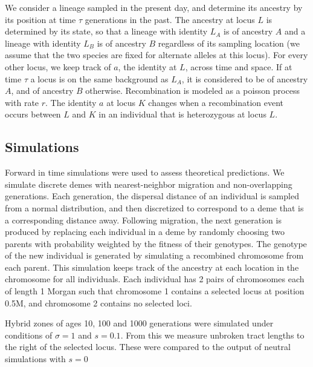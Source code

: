 \documentclass[12pt]{article}
\begin{document}
We consider a lineage sampled in the present day, and determine its ancestry by its position at time $\tau$ generations in the past. The ancestry at locus $L$ is determined by its state, so that a lineage with identity $L_A$ is of ancestry $A$ and a lineage with identity $L_B$ is of ancestry $B$ regardless of its sampling location (we assume that the two species are fixed for alternate alleles at this locus). For every other locus, we keep track of $a$, the identity at $L$, across time and space. If at time $\tau$ a locus is on the same background as $L_A$, it is considered to be of ancestry $A$, and of ancestry $B$ otherwise. Recombination is modeled as a poisson process with rate $r$. The identity $a$ at locus $K$ changes when a recombination event occurs between $L$ and $K$ in an individual that is heterozygous at locus $L$. 





\subsection{Simulations}
Forward in time simulations were used to assess theoretical predictions. We simulate discrete demes with nearest-neighbor migration and non-overlapping generations. Each generation, the dispersal distance of an individual is sampled from a normal distribution, and then discretized to correspond to a deme that is a corresponding distance away. Following migration, the next generation is produced by replacing each individual in a deme by randomly choosing two parents with probability weighted by the fitness of their genotypes. The genotype of the new individual is generated by simulating a recombined chromosome from each parent. This simulation keeps track of the ancestry at each location in the chromosome for all individuals. Each individual has 2 pairs of chromosomes each of length 1 Morgan such that chromosome 1 contains a selected locus at position 0.5M, and chromosome 2 contains no selected loci.

Hybrid zones of ages 10, 100 and 1000 generations were simulated under conditions of $\sigma=1$ and $s=0.1$. From this we measure unbroken tract lengths to the right of the selected locus. These were compared to the output of neutral simulations with $s=0$
\end{document}
